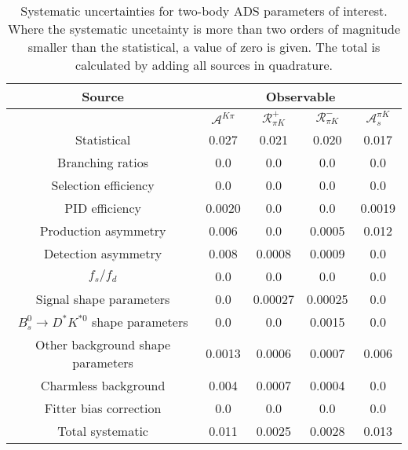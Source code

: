 \begin{sidewaystable}
  \centering
  \begin{tabular}{ccccc}
      \toprule
      Source & \multicolumn{4}{c}{Observable} \\
      \midrule
       & $\mathcal{A}^{K\pi}$ & $\mathcal{R}_{\pi K}^+$ & $\mathcal{R}_{\pi K}^-$ & $\mathcal{A}_s^{\pi K}$ \\
      \midrule
      Statistical & 0.027 & 0.021 & 0.020 & 0.017 \\
      \midrule
      Branching ratios & 0.0  & 0.0  & 0.0  & 0.0  \\
      Selection efficiency & 0.0  & 0.0  & 0.0  & 0.0  \\
      PID efficiency & 0.0020 & 0.0  & 0.0  & 0.0019 \\
      Production asymmetry & 0.006 & 0.0  & 0.0005 & 0.012 \\
      Detection asymmetry & 0.008 & 0.0008 & 0.0009 & 0.0  \\
      $f_s/f_d$ & 0.0  & 0.0  & 0.0  & 0.0  \\
      Signal shape parameters & 0.0  & 0.00027 & 0.00025 & 0.0  \\
      $B^0_s \to D^* K^{*0}$ shape parameters & 0.0  & 0.0  & 0.0015 & 0.0  \\
      Other background shape parameters & 0.0013 & 0.0006 & 0.0007 & 0.006 \\
      Charmless background & 0.004 & 0.0007 & 0.0004 & 0.0  \\
      Fitter bias correction & 0.0  & 0.0  & 0.0  & 0.0  \\
      \midrule
      Total systematic & 0.011 & 0.0025 & 0.0028 & 0.013 \\
      \bottomrule
  \end{tabular}
  \caption{Systematic uncertainties for two-body ADS parameters of interest. Where the systematic uncetainty is more than two orders of magnitude smaller than the statistical, a value of zero is given. The total is calculated by adding all sources in quadrature.}
\label{tab:twoBody_ADS_systematics}
\end{sidewaystable}
